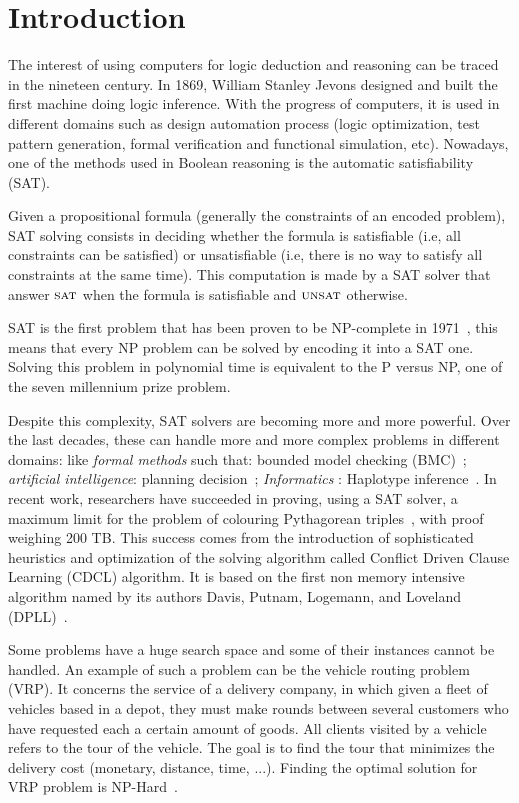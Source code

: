 \chapter{Introduction}\label{chap:intro}


The interest of using computers for logic deduction and reasoning can be traced in the nineteen century.
In 1869,  William Stanley Jevons designed and built the first machine doing logic inference.
With the progress of computers, it is used in different domains such as design automation process 
(logic optimization, test pattern generation, formal verification and functional simulation, etc).
Nowadays, one of the methods used in Boolean reasoning is the automatic satisfiability (SAT).

Given a propositional formula (generally the constraints of an encoded problem),
SAT solving consists in deciding whether the formula is satisfiable (i.e, all constraints can be
satisfied) or unsatisfiable (i.e, there is no way to satisfy all constraints at the same time).
This computation is made by a SAT solver that answer $\textsc{sat}$ when the formula is satisfiable
and $\textsc{unsat}$ otherwise.

SAT is the first problem that has been proven to be NP-complete in 1971~\cite{cook1971complexity}, this 
means that every NP problem can be solved by encoding it into a SAT one. Solving this problem in 
polynomial time is equivalent to the P versus NP, one of the seven millennium prize problem.


Despite this complexity, SAT solvers are becoming more and more powerful.
Over the last decades, these can handle more and more complex problems in different domains:
like \emph{formal methods} such that: bounded model checking (BMC)~\cite{bmc_99}; \emph{artificial intelligence}: planning decision~\cite{planning_92}; \emph{Informatics} : Haplotype inference~\cite{biology_06}.
In recent work, researchers have succeeded in proving, using a SAT solver, a maximum limit
for the problem of colouring Pythagorean triples~\cite{heule2016solving}, with proof weighing 200 TB.
This success comes from the introduction of sophisticated heuristics and optimization of the solving 
algorithm called Conflict Driven Clause Learning (CDCL) algorithm. It is based on the first non memory
intensive algorithm named by its authors Davis, Putnam, Logemann, and Loveland (DPLL)~\cite{dpll_62}.



Some problems have a huge search space and some of their instances cannot be handled.
An example of such a problem can be the vehicle routing problem (VRP).
It concerns the service of a delivery company, in which
given a fleet of vehicles based in a depot, they must make rounds between several customers  who have requested
each a certain amount of goods. All clients visited by a vehicle refers to the tour of the vehicle. 
The goal is to find the tour that minimizes the delivery cost (monetary, distance, time, ...).
Finding the optimal solution for VRP problem is NP-Hard~\cite{toth2002vehicle}.

